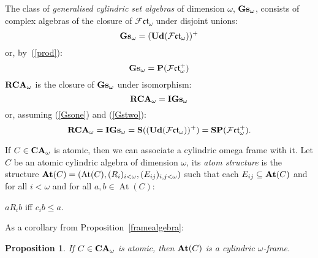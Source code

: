 \documentclass{article}
\theoremstyle{defin}
\theoremstyle{theorem}
\theoremstyle{claim}
\theoremstyle{prop}
\newtheorem{prop}{Proposition}
\theoremstyle{lemma}
\theoremstyle{fact}
\theoremstyle{remark}
\theoremstyle{ex}
\theoremstyle{col}
\theoremstyle{question}
\begin{document}
The class of \emph{generalised cylindric set algebras} of dimension $\omega$, ${\bf Gs}_{\omega}$, consists of complex algebras of the closure of $\mathcal{F}\mathfrak{ct}_{\omega}$ under disjoint unions:
\begin{equation} \label{Gsone}
{\bf Gs}_{\omega} = ({\bf Ud}(\mathcal{F}\mathfrak{ct}_{\omega}))^{+}
\end{equation}
or, by~(\ref{prod}):
\begin{equation} \label{Gstwo}
{\bf Gs}_{\omega} = {\bf P} (\mathcal{F}\mathfrak{ct}_{\omega}^{+})
\end{equation}
${\bf RCA}_{\omega}$ is the closure of ${\bf Gs}_{\omega}$ under isomorphism:
\begin{equation}
{\bf RCA}_{\omega} = {\bf IGs}_{\omega}
\end{equation}
or, assuming (\ref{Gsone}) and (\ref{Gstwo}):
\begin{equation}
{\bf RCA}_{\omega} = {\bf IGs}_{\omega} = {\bf S} (({\bf Ud} (\mathcal{F}\mathfrak{ct}_{\omega}))^{+}) = {\bf S} {\bf P} (\mathcal{F}\mathfrak{ct}_{\omega}^{+}).
\end{equation}

\vspace{\baselineskip}

If $C \in {\bf CA}_{\omega}$ is atomic, then we can associate a cylindric omega frame with it. Let $C$ be an atomic cylindric algebra of dimension $\omega$, its \emph{atom structure} is the structure ${\bf At}(C) = (\operatorname{At}(C), (R_i)_{i < \omega}, (E_{ij})_{i, j < \omega})$ such that each $E_{ij} \subseteq {\bf At}(C)$ and for all $i < \omega$ and for all $a, b \in \operatorname{At}(C)$:
\begin{center}
$a R_i b$ iff $c_i b \leq a$.
\end{center}

As a corollary from Proposition~\ref{framealgebra}:

\begin{prop}
If $C \in {\bf CA}_{\omega}$ is atomic, then ${\bf At}(C)$ is a cylindric $\omega$-frame.
\end{prop}
\end{document}

